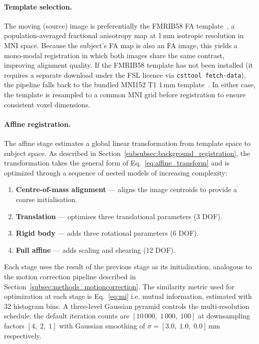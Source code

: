 \paragraph{Template selection.}

The moving (source) image is preferentially the FMRIB58 FA template~\cite{smith2006tract}, a population-averaged fractional anisotropy map at 1\,mm isotropic resolution in MNI space. Because the subject's FA map is also an FA image, this yields a mono-modal registration in which both images share the same contrast, improving alignment quality. If the FMRIB58 template has not been installed (it requires a separate download under the FSL licence via \texttt{csttool fetch-data}), the pipeline falls back to the bundled MNI152 T1 1\,mm template~\cite{fonov2011unbiased}. In either case, the template is resampled to a common MNI grid before registration to ensure consistent voxel dimensions.

\paragraph{Affine registration.}

The affine stage estimates a global linear transformation from template space to subject space. As described in Section~\ref{subsubsec:background_registration}, the transformation takes the general form of Eq.~\ref{eq:affine_transform} and is optimized through a sequence of nested models of increasing complexity:

\begin{enumerate}
	\item \textbf{Centre-of-mass alignment} --- aligns the image centroids to provide a coarse initialisation.
	\item \textbf{Translation} --- optimises three translational parameters (3 DOF).
	\item \textbf{Rigid body} --- adds three rotational parameters (6 DOF).
	\item \textbf{Full affine} --- adds scaling and shearing (12 DOF).
\end{enumerate}

Each stage uses the result of the previous stage as its initialization, analogous to the motion correction pipeline described in Section~\ref{subsec:methods_motioncorrection}. The similarity metric used for optimization at each stage is Eq.~\ref{eq:mi} i.e. mutual information, estimated with 32 histogram bins. A three-level Gaussian pyramid controls the multi-resolution schedule: the default iteration counts are $[10\,000,\; 1\,000,\; 100]$ at downsampling factors $[4,\; 2,\; 1]$ with Gaussian smoothing of $\sigma = [3.0,\; 1.0,\; 0.0]$\,mm respectively.

